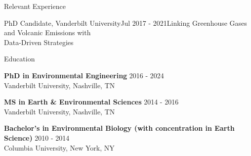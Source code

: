 \documentclass{resume} %
\newcommand{\commentblock}[1]{}
\begin{document}
\begin{rSection}{Relevant Experience}
{\begin{rSubsection}{PhD Candidate, Vanderbilt University}{Jul 2017 - 2021}{Linking Greenhouse Gases and Volcanic Emissions with \\ Data-Driven Strategies}{}
        \end{rSubsection}
    }
    
    \commentblock{
        \begin{rSubsection}{MS Candidate, Vanderbilt University}{Oct 2015 - Aug 2016}{Robust Statistical Analysis of Fugitive Methane Emissions at Hydraulically Fractured Sites}{Oliver Springs, TN}
        \item {Fashioned a mobile laboratory with state-of-the-art gas analyzer and accompanying equipment}
        \item {Implemented many variants of two-sample hypothesis (A/B) tests to separate the true amounts \\ of normal background gases from fugitive leaks caused by hydraulic fracturing procedures}
        
        \end{rSubsection}
    }

    
    \end{rSection} 


\begin{rSection}{Education}

    {\bf PhD in Environmental Engineering} \hfill {2016 - 2024}
    \\ 
    Vanderbilt University, Nashville, TN 
    
    {\bf MS in Earth \& Environmental Sciences}  \hfill {2014 - 2016}
    \\
    Vanderbilt University, Nashville, TN
     
    {\bf Bachelor's in Environmental Biology (with concentration in Earth Science)}  \hfill {2010 - 2014}
    \\
    Columbia University, New York, NY
    
    \end{rSection}

\end{document}

